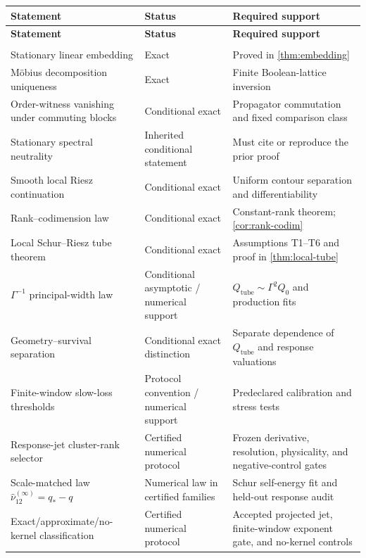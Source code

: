 \documentclass[11pt]{article}
\theoremstyle{definition}
\theoremstyle{remark}
\begin{document}
\begin{longtable}{>{\raggedright\arraybackslash}p{} >{\raggedright\arraybackslash}p{} >{\raggedright\arraybackslash}p{}}
\toprule
\textbf{Statement} & \textbf{Status} & \textbf{Required support}\\
\midrule
\endfirsthead
\toprule
\textbf{Statement} & \textbf{Status} & \textbf{Required support}\\
\midrule
\endhead
\midrule
\multicolumn{3}{r}{\emph{Continued on the next page}}\\
\endfoot
\bottomrule
\endlastfoot
Stationary linear embedding & Exact & Proved in \cref{thm:embedding}\\
M\"obius decomposition uniqueness & Exact & Finite Boolean-lattice inversion\\
Order-witness vanishing under commuting blocks & Conditional exact & Propagator commutation and fixed comparison class\\
Stationary spectral neutrality & Inherited conditional statement & Must cite or reproduce the prior proof\\
Smooth local Riesz continuation & Conditional exact & Uniform contour separation and differentiability\\
Rank--codimension law & Conditional exact & Constant-rank theorem; \cref{cor:rank-codim}\\
Local Schur--Riesz tube theorem & Conditional exact & Assumptions T1--T6 and proof in \cref{thm:local-tube}\\
$\Gamma^{-1}$ principal-width law & Conditional asymptotic / numerical support & $Q_{\mathrm{tube}}\sim\Gamma^2Q_0$ and production fits\\
Geometry--survival separation & Conditional exact distinction & Separate dependence of $Q_{\mathrm{tube}}$ and response valuations\\
Finite-window slow-loss thresholds & Protocol convention / numerical support & Predeclared calibration and stress tests\\
Response-jet cluster-rank selector & Certified numerical protocol & Frozen derivative, resolution, physicality, and negative-control gates\\
Scale-matched law $\widehat\nu_{12}^{(\infty)}=q_*-q$ & Numerical law in certified families & Schur self-energy fit and held-out response audit\\
Exact/approximate/no-kernel classification & Certified numerical protocol & Accepted projected jet, finite-window exponent gate, and no-kernel controls\\

\end{longtable}
\end{document}
